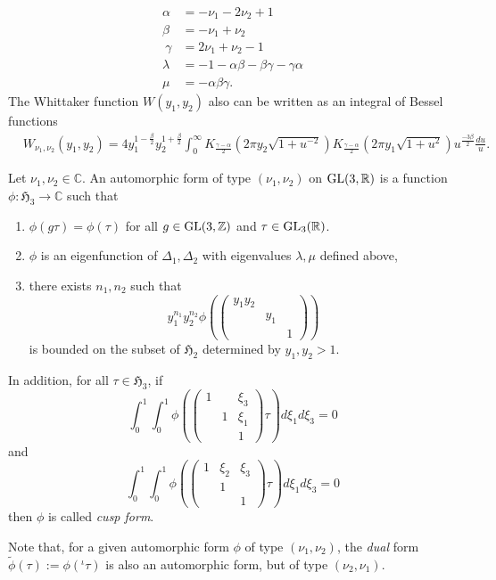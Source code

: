 \begin{align*}
    \alpha &= -\nu_{1} - 2\nu_{2} +1 \\
    \beta &= -\nu_{1} + \nu_{2} \\\
    \gamma &= 2\nu_{1} + \nu_{2} - 1 \\
    \lambda &= -1 - \alpha\beta - \beta\gamma - \gamma\alpha \\
    \mu &= -\alpha\beta\gamma.
\end{align*}
The Whittaker function $W(y_1, y_2)$ also can be written as an integral of Bessel functions
\begin{align*}
    &W_{\nu_{1}, \nu_{2}}(y_{1}, y_{2}) = 4y_{1}^{1 - \frac{\beta}{2}}y_{2}^{1 + \frac{\beta}{2}} \int_{0}^{\infty} K_{\frac{\gamma - \alpha}{2}}(2\pi y_{2} \sqrt{1 + u^{-2}}) K_{\frac{\gamma - \alpha}{2}}(2\pi y_{1} \sqrt{1 + u^{2}}) u^{\frac{-3\beta}{2}} \frac{du}{u}.
\end{align*}


\begin{definition}
Let $\nu_{1}, \nu_{2} \in \mathbb{C}$.
An automorphic form of type $(\nu_{1}, \nu_{2})$ on $\operatorname{\mathrm{GL}}(3, \mathbb{R})$ is a function $\phi: \mathfrak{H}_{3} \to \mathbb{C}$ such that 
\begin{enumerate}
    \item $\phi(g\tau) = \phi(\tau)$ for all $g\in \operatorname{\mathrm{GL}}(3, \mathbb{Z})$ and $\tau \in \operatorname{\mathrm{GL}}_{3}(\mathbb{R})$.
    \item $\phi$ is an eigenfunction of $\Delta_{1}, \Delta_{2}$ with eigenvalues $\lambda, \mu$ defined above,
    \item there exists $n_{1}, n_{2}$ such that 
    $$
    y_{1}^{n_{1}}y_{2}^{n_{2}} \phi\left(\begin{pmatrix}
    y_{1}y_{2} & & \\ & y_{1} & \\ & & 1
    \end{pmatrix}\right)
    $$
    is bounded on the subset of $\mathfrak{H}_{2}$ determined by $y_{1}, y_{2} > 1$.
\end{enumerate}
In addition, for all $\tau\in \mathfrak{H}_{3}$, if
$$
\int_{0}^{1} \int_{0}^{1} \phi\left(\begin{pmatrix}
1 & & \xi_{3} \\ & 1 & \xi_{1} \\ & & 1
\end{pmatrix}\tau\right) d\xi_{1} d\xi_{3} = 0
$$
and
$$
\int_{0}^{1} \int_{0}^{1} \phi\left(\begin{pmatrix}
1 & \xi_{2} & \xi_{3} \\ & 1 & \\ & & 1
\end{pmatrix}\tau\right) d\xi_{1} d\xi_{3} = 0
$$
then $\phi$ is called \emph{cusp form}.
\end{definition}
Note that, for a given automorphic form $\phi$ of type $(\nu_1, \nu_2)$, the \emph{dual} form $\tilde{\phi}(\tau) := \phi({}^{\iota}\tau)$ is also an automorphic form, but of type $(\nu_2, \nu_1)$.

